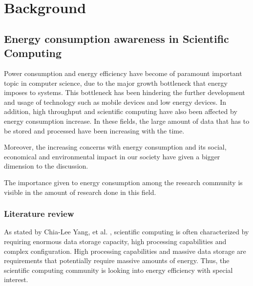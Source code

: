\chapter{Background}


\section{Energy consumption awareness in Scientific Computing}
Power consumption and energy efficiency have become of paramount important topic in 
computer science, due to the major growth bottleneck that energy imposes to systems. This bottleneck has been hindering the further development and usage of technology such as mobile devices and low energy devices. In addition, high throughput and scientific computing have also been affected by energy consumption increase. In these fields, the large amount of data that has to be stored and processed have been increasing with the time. 

Moreover, the increasing concerns with energy consumption and its social, economical 
and environmental impact in our society have given a bigger dimension to the discussion.

The importance given to energy consumption among the research community is visible in the amount of research done in this field.

\subsection*{Literature review} %
As stated by Chia-Lee Yang, et al. \cite{SCICOMPUTING_REQS}, scientific computing is often characterized by requiring enormous data storage capacity, high processing capabilities and complex configuration. High processing capabilities and massive data storage are requirements that potentially require massive amounts of energy. Thus, the scientific 
computing community is looking into energy efficiency with special interest.


